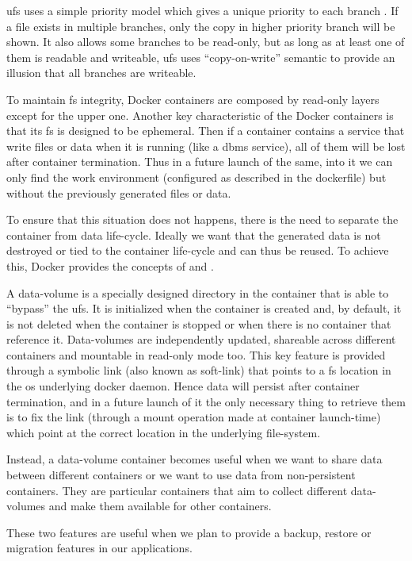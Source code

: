 \ac{ufs} uses a simple priority model which gives a unique priority to each branch . If a file exists
in multiple branches, only the copy in higher priority branch will be shown. It also allows some branches
to be read-only, but as long as at least one of them is readable and writeable, \ac{ufs} uses ``copy-on-write''
semantic to provide an illusion that all branches are writeable.

To maintain \ac{fs} integrity, Docker containers are composed by read-only layers except for the 
upper one. Another key characteristic of the Docker containers is that its \ac{fs} is designed to
be ephemeral. Then if a container contains a service that write files or data when it is running 
(like a \ac{dbms} service), all of them will be lost after container termination. Thus in a future
launch of the same, into it we can only find the work environment (configured as described in 
the dockerfile) but without the previously generated files or data.

To ensure that this situation does not happens, there is the need to separate the container from
data life-cycle. Ideally we want that the generated data is not destroyed or tied to the container
life-cycle and can thus be reused. To achieve this, Docker provides the concepts of 
and .

A data-volume is a specially designed directory in the container that is able to “bypass” the \ac{ufs}.
It is initialized when the container is created and, by default, it is not deleted when the container
is stopped or when there is no container that reference it. Data-volumes are independently updated,
shareable across different containers and mountable in read-only mode too. This key feature is provided
through a symbolic link (also known as soft-link) that points to a \ac{fs} location in the \acs{os}
underlying docker daemon. Hence data will persist after container termination, and in a future launch
of it the only necessary thing to retrieve them is to fix the link (through a mount operation made at
container launch-time) which point at the correct location in the underlying file-system.

Instead, a data-volume container becomes useful when we want to share data between different containers
or we want to use data from non-persistent containers. They are particular containers that aim to collect
different data-volumes and make them available for other containers.

These two features are useful when we plan to provide a backup, restore or migration features in our
applications.

